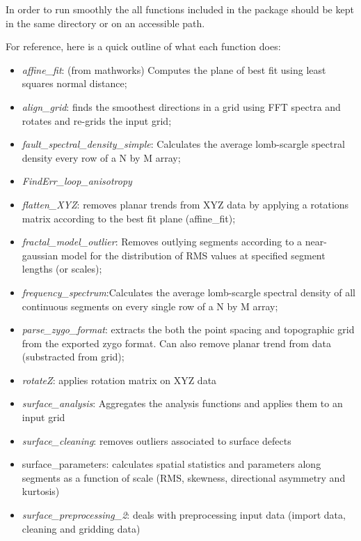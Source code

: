 \documentclass[12pt,a4paper]{article}
\begin{document}
In order to run smoothly the all functions included in the package should be kept in the same directory or on an accessible path. 

For reference, here is a quick outline of what each function does:

\begin{itemize}
	\item[] \textit{affine\_fit}: (from mathworks) Computes the plane of best fit using least squares normal distance;
	\item[] \textit{align\_grid}: finds the smoothest directions in a grid using FFT spectra and rotates and re-grids the input grid;
	\item[] \textit{fault\_spectral\_density\_simple}: Calculates the average lomb-scargle spectral density every row of a N by M array;
	\item[] \textit{FindErr\_loop\_anisotropy}
	\item[] \textit{flatten\_XYZ}: removes planar trends from XYZ data by applying a rotations matrix according to the best fit plane (affine\_fit);
	\item[] \textit{fractal\_model\_outlier}: Removes outlying segments according to a near-gaussian model for the distribution of RMS values at specified segment lengths (or scales);
	\item[] \textit{frequency\_spectrum}:Calculates the average lomb-scargle spectral density of all continuous 	segments on every single row of a N by M array;
	\item[] \textit{parse\_zygo\_format}: extracts the both the point spacing and topographic grid from the exported zygo format. Can also remove planar trend from data (substracted from grid);
	\item[] \textit{rotateZ}: applies rotation matrix on XYZ data
	\item[] \textit{surface\_analysis}: Aggregates the analysis functions and applies them to an input grid
	\item[] \textit{surface\_cleaning}: removes outliers associated to surface defects
	\item[] surface\_parameters: calculates spatial statistics and parameters along segments as a function of scale (RMS, skewness, directional asymmetry and kurtosis)
	\item[] \textit{surface\_preprocessing\_2}: deals with preprocessing input data (import data, cleaning and gridding data)
\end{itemize}
\end{document}
